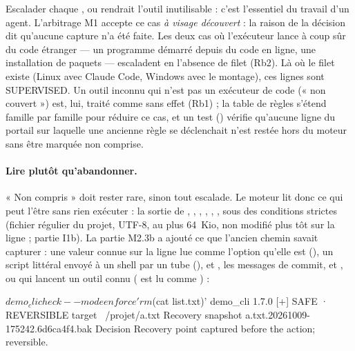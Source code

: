 \begin{pourquoi}
Escalader chaque ,  ou  rendrait l'outil
inutilisable : c'est l'essentiel du travail d'un agent. L'arbitrage M1 accepte ce cas \emph{à
visage découvert} : la raison de la décision dit qu'aucune capture n'a été faite. Les deux cas
où l'exécuteur lance à coup sûr du code étranger --- un programme démarré depuis du code en
ligne, une installation de paquets --- escaladent en l'absence de filet (Rb2). Là où le filet
existe (Linux avec Claude Code, Windows avec le montage), ces lignes sont SUPERVISED. Un
outil inconnu qui n'est pas un exécuteur de code (« non couvert ») est, lui, traité comme
sans effet (Rb1) ; la table de règles s'étend famille par famille pour réduire ce cas, et un
test () vérifie qu'aucune ligne du portail sur laquelle une ancienne
règle se déclenchait n'est restée hors du moteur sans être marquée non comprise.
\end{pourquoi}

\paragraph{Lire plutôt qu'abandonner.} « Non compris » doit rester rare, sinon tout escalade.
Le moteur lit donc ce qui peut l'être sans rien exécuter : la sortie de , , , , , , sous des
conditions strictes (fichier régulier du projet, UTF-8, au plus 64~Kio, non modifié plus tôt
sur la ligne ; partie I1b). La partie M2.3b a ajouté ce que l'ancien chemin savait capturer :
une valeur connue sur la ligne lue comme l'option qu'elle est (), un
script littéral envoyé à un shell par un tube (),
 et , les messages de commit, et
,  ou  qui lancent un outil connu ( est lu comme ) :

\begin{terminal}
$ demo_cli check --mode enforce 'rm $(cat list.txt)'
demo_cli 1.7.0  [+] SAFE  ·  REVERSIBLE
  target              ~/projet/a.txt
Recovery
  snapshot            a.txt.20261009-175242.6d6ca4f4.bak
Decision
  Recovery point captured before the action; reversible.
\end{terminal}

